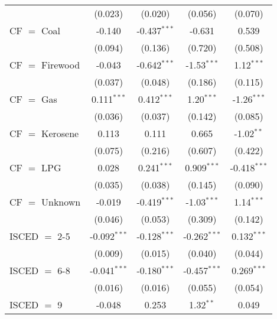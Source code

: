 \begin{table}[htbp!]
\begin{adjustbox}{width = 1\textwidth, max height = 0.95\textheight, center}
\begin{threeparttable}[b]
\begin{tabular}{lcccc}
                                 & (0.023)            & (0.020)            & (0.056)        & (0.070)\\   
            CF $=$ Coal          & -0.140             & -0.437$^{***}$     & -0.631         & 0.539\\   
                                 & (0.094)            & (0.136)            & (0.720)        & (0.508)\\   
            CF $=$ Firewood      & -0.043             & -0.642$^{***}$     & -1.53$^{***}$  & 1.12$^{***}$\\   
                                 & (0.037)            & (0.048)            & (0.186)        & (0.115)\\   
            CF $=$ Gas           & 0.111$^{***}$      & 0.412$^{***}$      & 1.20$^{***}$   & -1.26$^{***}$\\   
                                 & (0.036)            & (0.037)            & (0.142)        & (0.085)\\   
            CF $=$ Kerosene      & 0.113              & 0.111              & 0.665          & -1.02$^{**}$\\   
                                 & (0.075)            & (0.216)            & (0.607)        & (0.422)\\   
            CF $=$ LPG           & 0.028              & 0.241$^{***}$      & 0.909$^{***}$  & -0.418$^{***}$\\   
                                 & (0.035)            & (0.038)            & (0.145)        & (0.090)\\   
            CF $=$ Unknown       & -0.019             & -0.419$^{***}$     & -1.03$^{***}$  & 1.14$^{***}$\\   
                                 & (0.046)            & (0.053)            & (0.309)        & (0.142)\\   
            ISCED $=$ 2-5        & -0.092$^{***}$     & -0.128$^{***}$     & -0.262$^{***}$ & 0.132$^{***}$\\   
                                 & (0.009)            & (0.015)            & (0.040)        & (0.044)\\   
            ISCED $=$ 6-8        & -0.041$^{***}$     & -0.180$^{***}$     & -0.457$^{***}$ & 0.269$^{***}$\\   
                                 & (0.016)            & (0.016)            & (0.055)        & (0.054)\\   
            ISCED $=$ 9          & -0.048             & 0.253              & 1.32$^{**}$    & 0.049\\   

\end{tabular}
\end{threeparttable}
\end{adjustbox}
\end{table}

